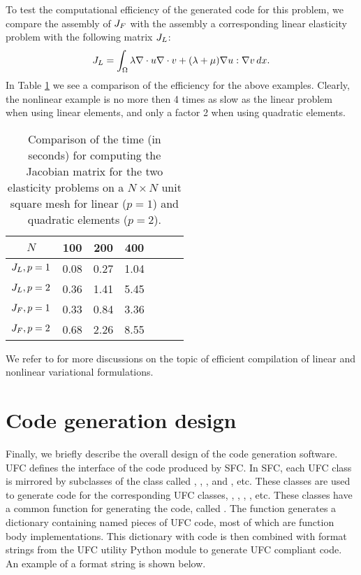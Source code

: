 To test the computational efficiency of the generated code for this
problem, we compare the assembly of $J_F$ with the assembly a
corresponding linear elasticity problem with the following matrix $J_L$:
\begin{equation}
J_L = \int_\Omega \lambda \nabla \cdot u \nabla \cdot v + (\lambda + \mu)\nabla u:\nabla v \, dx .
\end{equation}
In Table \ref{SFCtest} we see a comparison of the efficiency for the
above examples.  Clearly, the nonlinear example is no more then 4 times
as slow as the linear problem when using linear elements, and only a
factor 2 when using quadratic elements.
\begin{table}[h]
\begin{center}
\begin{tabular}{|c|c|c|c|c|c|c|} \hline
$N$              & 100   & 200  & 400    \\ \hline
$J_L, p=1$     & 0.08  & 0.27  & 1.04     \\ \hline
$J_L, p=2$     & 0.36  & 1.41  & 5.45      \\ \hline
$J_F, p=1$     & 0.33  & 0.84  & 3.36     \\ \hline
$J_F, p=2$     & 0.68  & 2.26  & 8.55     \\ \hline
\end{tabular}
\caption{Comparison of the time (in seconds) for computing the Jacobian
matrix for the two elasticity problems on a $N\times N$ unit square mesh
for linear ($p=1$) and quadratic elements ($p=2$).}
\label{SFCtest}
\end{center}
\end{table}

We refer to
\citet{AlnaesMardal2009b,OelgaardLoggWells2008,KirbyLogg2008,OelgaardWells2010}
for more discussions on the topic of efficient compilation of linear
and nonlinear variational formulations.



\section{Code generation design}

Finally, we briefly describe the overall design of the code
generation software.  UFC defines the interface of the code produced
by SFC.  In SFC, each UFC class is mirrored by subclasses of the
class  called , ,
, and , etc.  These classes
are used to generate code for the corresponding UFC classes, ,
, , , etc. These
classes have a common function for generating the code, called
.  The function 
generates a dictionary containing named pieces of UFC code, most of
which are function body implementations.  This dictionary with code is
then combined with format strings from the UFC utility Python module
to generate UFC compliant code.  An example of a format string is
shown below.

